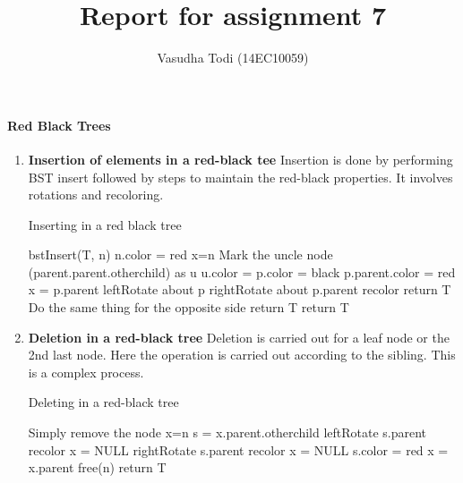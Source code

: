 \documentclass[a4paper,11pt]{article}
\title{Report for assignment 7}
\author{Vasudha Todi (14EC10059)}
\begin{document}
\maketitle


\paragraph{Red Black Trees}
\begin{enumerate}
 \item \textbf{Insertion of elements in a red-black tee}
Insertion is done by performing BST insert followed by steps to maintain the red-black properties. It involves rotations and recoloring.

  \begin{algorithm}
    \caption{Inserting in a red black tree}
    \begin{algorithmic}[1]
    \State bstInsert(T, n)
    \State n.color = red
    \State x=n
        \State Mark the uncle node (parent.parent.otherchild) as u
            \State u.color = p.color = black
            \State p.parent.color = red
            \State x = p.parent
        \EndIf
                \State leftRotate about p
            \EndIf
            \State rightRotate about p.parent
            \State recolor
            \State return T
        \EndIf
            \State Do the same thing for the opposite side
            \State return T
        \EndIf
    \EndWhile
    return T
    \end{algorithmic}
  \end{algorithm}


 \item \textbf{Deletion in a red-black tree}
Deletion is carried out for a leaf node or the 2nd last node. Here the operation is carried out according to the sibling. This is a complex process.


  \begin{algorithm}
    \caption{Deleting in a red-black tree}
    \begin{algorithmic}[1]
        \State Simply remove the node
    \Else
        \State x=n
            \State s = x.parent.otherchild
                \State leftRotate s.parent
                \State recolor
                \State x = NULL
                \State rightRotate s.parent
                \State recolor
                \State x = NULL
            \Else
                \State s.color = red
                \State x = x.parent
            \EndIf
        \EndWhile
    \EndIf
    \State free(n)
    \State return T
    \end{algorithmic}
  \end{algorithm}
  

\end{enumerate}
\end{document}
